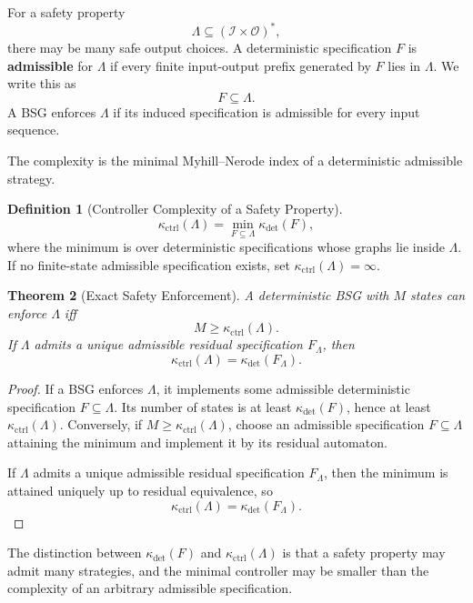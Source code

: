 \documentclass[12pt]{article}
\newtheorem{theorem}{Theorem}[section]
\theoremstyle{definition}
\newtheorem{definition}[theorem]{Definition}
\begin{document}
For a safety property
\[
\Lambda\subseteq(\mathcal I\times\mathcal O)^*,
\]
there may be many safe output choices.  A deterministic specification $F$ is
\textbf{admissible} for $\Lambda$ if every finite input-output prefix generated
by $F$ lies in $\Lambda$.  We write this as
\[
F\subseteq\Lambda.
\]
A BSG enforces $\Lambda$ if its induced specification is admissible for every
input sequence.

The complexity is the minimal Myhill--Nerode index of a deterministic
admissible strategy.

\begin{definition}[Controller Complexity of a Safety Property]
\label{def:controller-complexity}
\[
\kappa_{\mathrm{ctrl}}(\Lambda)
=
\min_{F\subseteq\Lambda}
\kappa_{\det}(F),
\]
where the minimum is over deterministic specifications whose graphs lie inside
$\Lambda$.  If no finite-state admissible specification exists, set
$\kappa_{\mathrm{ctrl}}(\Lambda)=\infty$.
\end{definition}

\begin{theorem}[Exact Safety Enforcement]
\label{thm:safety-enforce}
A deterministic BSG with $M$ states can enforce $\Lambda$ iff
\[
M\ge\kappa_{\mathrm{ctrl}}(\Lambda).
\]
If $\Lambda$ admits a unique admissible residual specification $F_\Lambda$,
then
\[
\kappa_{\mathrm{ctrl}}(\Lambda)
=
\kappa_{\det}(F_\Lambda).
\]
\end{theorem}

\begin{proof}
If a BSG enforces $\Lambda$, it implements some admissible deterministic
specification $F\subseteq\Lambda$.  Its number of states is at least
$\kappa_{\det}(F)$, hence at least $\kappa_{\mathrm{ctrl}}(\Lambda)$.
Conversely, if $M\ge\kappa_{\mathrm{ctrl}}(\Lambda)$, choose an admissible
specification $F\subseteq\Lambda$ attaining the minimum and implement it by its
residual automaton.

If $\Lambda$ admits a unique admissible residual specification $F_\Lambda$,
then the minimum is attained uniquely up to residual equivalence, so
\[
\kappa_{\mathrm{ctrl}}(\Lambda)
=
\kappa_{\det}(F_\Lambda).
\]
\end{proof}

The distinction between $\kappa_{\det}(F)$ and
$\kappa_{\mathrm{ctrl}}(\Lambda)$ is that a safety property may admit many
strategies, and the minimal controller may be smaller than the complexity of an
arbitrary admissible specification.
\end{document}
